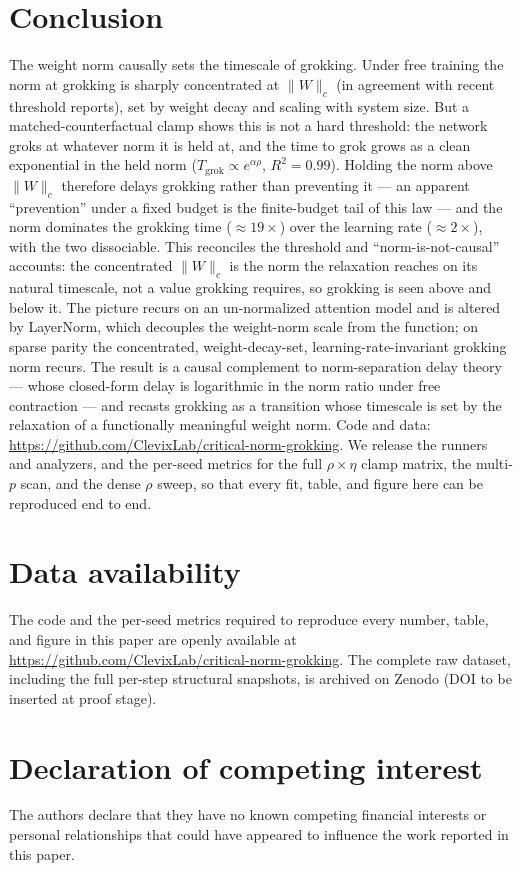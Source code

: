 \documentclass[10pt,twocolumn]{article}
\newcommand{\Wc}{\|W\|_{c}}
\begin{document}
\section{Conclusion}
The weight norm causally sets the timescale of grokking. Under free training the norm at grokking is sharply
concentrated at $\Wc$ (in agreement with recent threshold reports), set by weight decay and scaling with
system size. But a matched-counterfactual clamp shows this is not a hard threshold: the network groks at
whatever norm it is held at, and the time to grok grows as a clean exponential in the held norm
($T_{\mathrm{grok}}\propto e^{\alpha\rho}$, $R^2=0.99$). Holding the norm above $\Wc$ therefore delays
grokking rather than preventing it --- an apparent ``prevention'' under a fixed budget is the finite-budget
tail of this law --- and the norm dominates the grokking time ($\approx\!19\times$) over the learning rate
($\approx\!2\times$), with the two dissociable. This reconciles the threshold and ``norm-is-not-causal''
accounts: the concentrated $\Wc$ is the norm the relaxation reaches on its natural timescale, not a value
grokking requires, so grokking is seen above and below it. The picture recurs on an un-normalized attention
model and is altered by LayerNorm, which decouples the weight-norm scale from the function; on sparse parity
the concentrated, weight-decay-set, learning-rate-invariant grokking norm recurs. The result is a causal
complement to norm-separation delay theory --- whose closed-form delay is logarithmic in the norm ratio
under free contraction --- and recasts grokking as a transition whose
timescale is set by the relaxation of a functionally meaningful weight norm.
Code and data: \url{https://github.com/ClevixLab/critical-norm-grokking}. We release the runners and
analyzers, and the per-seed metrics for the full $\rho\times\eta$ clamp matrix, the multi-$p$ scan, and the
dense $\rho$ sweep, so that every fit, table, and figure here can be reproduced end to end.


\section*{Data availability}
The code and the per-seed metrics required to reproduce every number, table, and figure in this paper are
openly available at \url{https://github.com/ClevixLab/critical-norm-grokking}. The complete raw dataset,
including the full per-step structural snapshots, is archived on Zenodo (DOI to be inserted at proof stage).

\section*{Declaration of competing interest}
The authors declare that they have no known competing financial interests or personal relationships that
could have appeared to influence the work reported in this paper.
\end{document}
